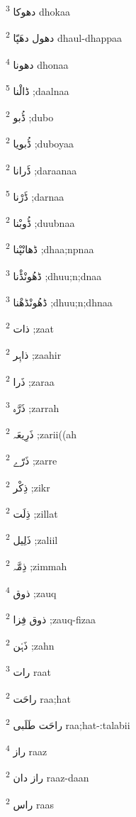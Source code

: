\documentclass[12pt]{article}
\begin{document}
\begin{multicols}{5}
{\ur دھوکا}   \textsuperscript{3} dhokaa

{\ur دھول دھَپّا}   \textsuperscript{2} dhaul-dhappaa

{\ur دھونا}   \textsuperscript{4} dhonaa

{\ur ڈالْنا}   \textsuperscript{5} ;daalnaa

{\ur ڈُبو}   \textsuperscript{2} ;dubo

{\ur ڈُبویا}   \textsuperscript{2} ;duboyaa

{\ur ڈَرانا}   \textsuperscript{2} ;daraanaa

{\ur ڈَرْنا}   \textsuperscript{5} ;darnaa

{\ur ڈُوبْنا}   \textsuperscript{2} ;duubnaa

{\ur ڈھانْپْنا}   \textsuperscript{2} ;dhaa;npnaa

{\ur ڈھُونْڈْنا}   \textsuperscript{3} ;dhuu;n;dnaa

{\ur ڈھُونْڈھْنا}   \textsuperscript{3} ;dhuu;n;dhnaa

{\ur ذات}   \textsuperscript{2} ;zaat

{\ur ذاہِر}   \textsuperscript{2} ;zaahir

{\ur ذَرا}   \textsuperscript{2} ;zaraa

{\ur ذَرَّہ}   \textsuperscript{3} ;zarrah

{\ur ذَرِیعَہ}   \textsuperscript{2} ;zarii((ah

{\ur ذَرّے}   \textsuperscript{2} ;zarre

{\ur ذِکْر}   \textsuperscript{2} ;zikr

{\ur ذِلَت}   \textsuperscript{2} ;zillat

{\ur ذَلِیل}   \textsuperscript{2} ;zaliil

{\ur ذِمَّہ}   \textsuperscript{2} ;zimmah

{\ur ذوق}   \textsuperscript{4} ;zauq

{\ur ذوق فِزا}   \textsuperscript{2} ;zauq-fizaa

{\ur ذَہْن}   \textsuperscript{2} ;zahn

{\ur رات}   \textsuperscript{3} raat

{\ur راحَت}   \textsuperscript{2} raa;hat

{\ur راحَت طَلَبی}   \textsuperscript{2} raa;hat-:talabii

{\ur راز}   \textsuperscript{4} raaz

{\ur راز دان}   \textsuperscript{2} raaz-daan

{\ur راس}   \textsuperscript{2} raas


\end{multicols}
\end{document}
